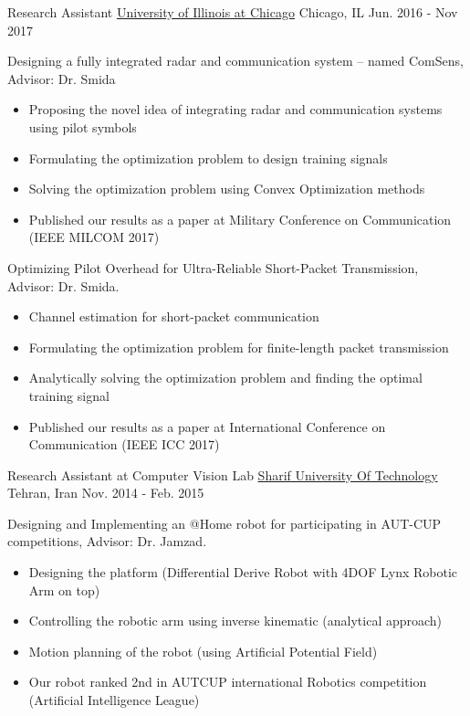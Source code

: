 \begin{cventries}
  \cventry
    {Research Assistant} %
    {\href{http://www.uic.edu}{University of Illinois at Chicago}} %
    {Chicago, IL} %
    {Jun. 2016 - Nov 2017} %
    {
      \begin{cvitems} %
		\item Designing a fully integrated radar and communication system – named ComSens, Advisor: Dr. Smida
		\begin{itemize}
				\item Proposing the novel idea of integrating radar and communication systems using pilot symbols
				\item Formulating the optimization problem to design training signals
				\item Solving the optimization problem using Convex Optimization methods
				\item Published our results as a paper at Military Conference on Communication (IEEE MILCOM 2017)
		\end{itemize}
		\item Optimizing Pilot Overhead for Ultra-Reliable Short-Packet Transmission, Advisor: Dr. Smida.
		\begin{itemize}
				\item Channel estimation for short-packet communication
				\item Formulating  the optimization problem for finite-length packet transmission
				\item Analytically solving the optimization problem and finding the optimal training signal
				\item Published our results as a paper at International Conference on Communication (IEEE ICC 2017)
		\end{itemize}				      
      \end{cvitems}
    }





  \cventry
    {Research Assistant at Computer Vision Lab} %
    {\href{http://www.sharif.ir/web/en}{Sharif University Of Technology}} %
    {Tehran, Iran} %
    {Nov. 2014 - Feb. 2015} %
    {
      \begin{cvitems} %
			\item Designing and Implementing an @Home robot for participating in AUT-CUP competitions, Advisor: Dr. Jamzad.
			\begin{itemize}
					\item Designing the platform (Differential Derive Robot with 4DOF Lynx Robotic Arm on top)
					\item Controlling the robotic arm using inverse kinematic (analytical approach)
					\item Motion planning of the robot (using Artificial Potential Field)
					\item Our robot ranked 2nd in AUTCUP international Robotics competition (Artificial Intelligence League)
			\end{itemize}
      \end{cvitems}
    }


\end{cventries}
